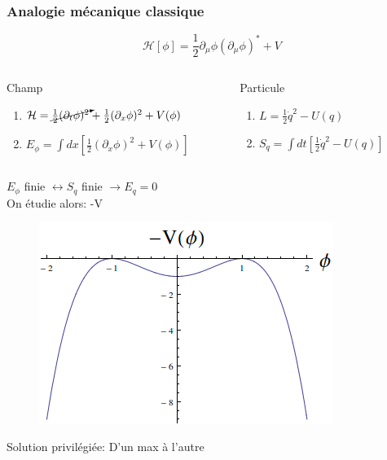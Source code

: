 \documentclass[handout]{beamer}
\begin{document}
\begin{frame} \frametitle{Analogie mécanique classique}
\begin{equation*}
\mathcal{H}[\phi] = \frac{1}{2} \partial_\mu \phi (\partial_\mu \phi)^* +V
\end{equation*}
\begin{columns}[T]
    \begin{column}[T]{.55\linewidth}
    Champ
    \begin{enumerate}
    \item $\mathcal{H} =  \cancelto{}{\frac{1}{2}  (\partial_t \phi)^2} +  \frac{1}{2}  (\partial_x \phi)^2 +V(\phi) $
    \item $E_\phi = \int{dx\left[\frac{1}{2}  (\partial_x \phi)^2 +V(\phi) \right]}$
    \end{enumerate}
    \end{column}
    \begin{column}[T]{.45\linewidth}
	Particule
    \begin{enumerate}
    \item $L =   \frac{1}{2}  \dot{q}^2 -U(q)$
    \item $S_q = \int{dt[\frac{1}{2}  \dot{q}^2 -U(q)] }$
    \end{enumerate}
    \end{column}
  \end{columns}
  
 
    $E_\phi$ finie $\leftrightarrow S_q$ finie $\rightarrow E_q = 0$\\
 On étudie alors: -V

  
\end{frame}

\begin{frame}
\begin{figure}
\includegraphics[scale=0.5]{pot_inv.png}
\end{figure}
Solution privilégiée: D'un max à l'autre
\end{frame}
\end{document}
